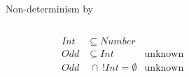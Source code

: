 \begin{frame}{Non-determinism by }
  \begin{columns}
    \begin{column}{0.35\textwidth}
      \centering
      
      \begin{align*}
        Int&\subseteq Number\\
        Odd&\subseteq Int &\text{unknown}\\
        Odd&~\cap~ !Int = \emptyset &\text{unknown}
      \end{align*}
      \scalebox{0.8}{}
    \end{column}%
    \begin{column}{0.7\textwidth}
      \only<1>{\scalebox{0.6}{}}%
    \end{column}
  \end{columns}

\end{frame}








\begin{frame}
  
\end{frame}
